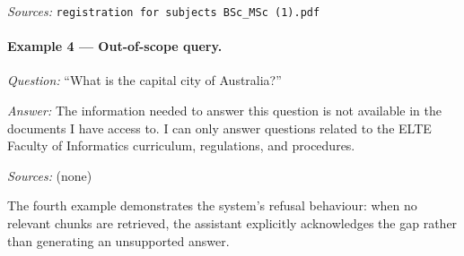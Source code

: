 \textit{Sources:} \texttt{registration for subjects BSc\_MSc (1).pdf}

\paragraph{Example 4 --- Out-of-scope query.}
\textit{Question:} ``What is the capital city of Australia?''

\textit{Answer:} The information needed to answer this question is not
available in the documents I have access to. I can only answer questions
related to the ELTE Faculty of Informatics curriculum, regulations, and
procedures.

\textit{Sources:} (none)

The fourth example demonstrates the system's refusal behaviour: when no
relevant chunks are retrieved, the assistant explicitly acknowledges the gap
rather than generating an unsupported answer.